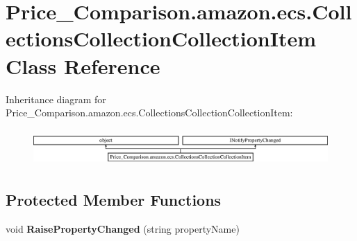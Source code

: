 \hypertarget{class_price___comparison_1_1amazon_1_1ecs_1_1_collections_collection_collection_item}{\section{Price\-\_\-\-Comparison.\-amazon.\-ecs.\-Collections\-Collection\-Collection\-Item Class Reference}
\label{class_price___comparison_1_1amazon_1_1ecs_1_1_collections_collection_collection_item}
}


 


Inheritance diagram for Price\-\_\-\-Comparison.\-amazon.\-ecs.\-Collections\-Collection\-Collection\-Item\-:\begin{figure}[H]
\begin{center}
\leavevmode
\includegraphics[height=1.417722cm]{class_price___comparison_1_1amazon_1_1ecs_1_1_collections_collection_collection_item}
\end{center}
\end{figure}
\subsection*{Protected Member Functions}
\begin{DoxyCompactItemize}
\item 
\hypertarget{class_price___comparison_1_1amazon_1_1ecs_1_1_collections_collection_collection_item_a317e53fae83da56c33fe16233f3d644c}{void {\bfseries Raise\-Property\-Changed} (string property\-Name)}\label{class_price___comparison_1_1amazon_1_1ecs_1_1_collections_collection_collection_item_a317e53fae83da56c33fe16233f3d644c}

\end{DoxyCompactItemize}
